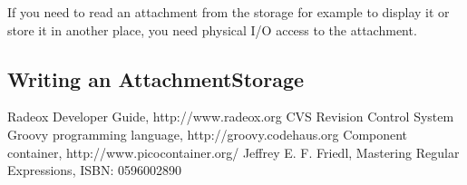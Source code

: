 \documentclass[a4paper,pdftex]{article}
\begin{document}
If you need to read an attachment from  the storage for example to display it or store it 
in another place, you need physical I/O access to the attachment.

\subsection{Writing an AttachmentStorage}





\begin{thebibliography}{}
 Radeox Developer Guide, http://www.radeox.org
 CVS Revision Control System
 Groovy programming language, http://groovy.codehaus.org
 Component container, http://www.picocontainer.org/
 Jeffrey E. F. Friedl, Mastering Regular Expressions, ISBN: 0596002890
\end{thebibliography}
\end{document}
